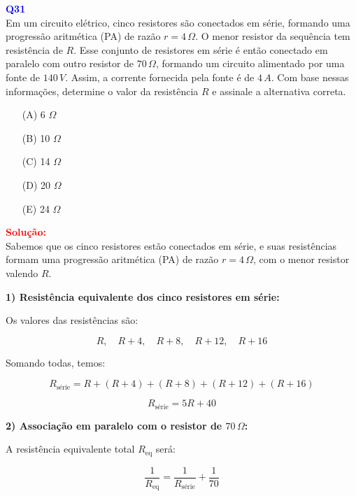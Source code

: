 \documentclass[a4paper,12pt]{article}
\begin{document}
\begin{flushleft}
\textbf{\textcolor{blue}{\Large Q31}}\\

Em um circuito elétrico, cinco resistores são conectados em série, formando uma progressão aritmética (PA) 
de razão \( r = 4 \, \Omega \). O menor resistor da sequência tem resistência de \( R \). Esse conjunto de 
resistores em série é então conectado em paralelo com outro resistor de \( 70 \, \Omega \), formando um circuito 
alimentado por uma fonte de \( 140 \, V \). Assim, a corrente fornecida pela fonte é de \( 4 \, A \). Com base 
nessas informações, determine o valor da resistência \( R \) e assinale a alternativa correta.


\begin{itemize}
\item[(A)] 6 $\Omega$
\item[(B)] 10 $\Omega$  
\item[(C)] 14 $\Omega$
\item[(D)] 20 $\Omega$
\item[(E)] 24 $\Omega$
\end{itemize}

\vspace{0.5cm}

\textcolor{red}{\textbf{Solução:}}\\

Sabemos que os cinco resistores estão conectados em série, e suas resistências formam uma progressão aritmética (PA) de razão \( r = 4 \, \Omega \), com o menor resistor valendo \( R \).

\bigskip

\textbf{1) Resistência equivalente dos cinco resistores em série:}

Os valores das resistências são:

\[
R, \quad R + 4, \quad R + 8, \quad R + 12, \quad R + 16
\]

Somando todas, temos:

\[
R_{\text{série}} = R + (R + 4) + (R + 8) + (R + 12) + (R + 16)
\]

\[
R_{\text{série}} = 5R + 40
\]

\bigskip

\textbf{2) Associação em paralelo com o resistor de \( 70 \, \Omega \):}

A resistência equivalente total \( R_{\text{eq}} \) será:

\[
\frac{1}{R_{\text{eq}}} = \frac{1}{R_{\text{série}}} + \frac{1}{70}
\]


\end{flushleft}
\end{document}
